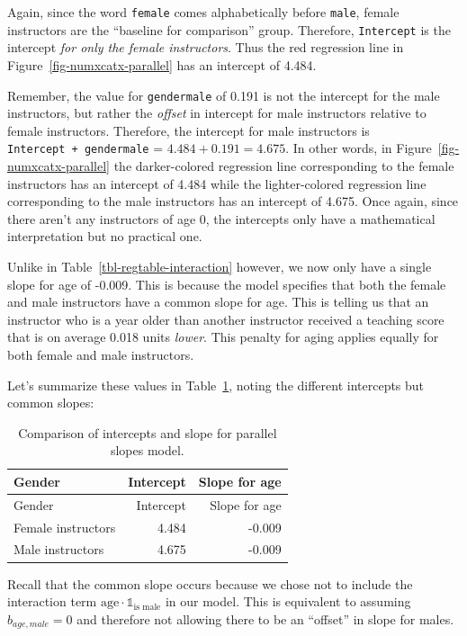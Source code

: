 \documentclass[
  letterpaper,
  DIV=11,
  numbers=noendperiod]{scrreprt}
\theoremstyle{definition}
\theoremstyle{remark}
\begin{document}
Again, since the word \texttt{female} comes alphabetically before
\texttt{male}, female instructors are the ``baseline for comparison''
group. Therefore, \texttt{Intercept} is the intercept \emph{for only the
female instructors}. Thus the red regression line in
Figure~\ref{fig-numxcatx-parallel} has an intercept of 4.484.

Remember, the value for \texttt{gendermale} of 0.191 is not the
intercept for the male instructors, but rather the \emph{offset} in
intercept for male instructors relative to female instructors.
Therefore, the intercept for male instructors is
\texttt{Intercept\ +\ gendermale} = \(4.484 + 0.191 = 4.675\). In other
words, in Figure~\ref{fig-numxcatx-parallel} the darker-colored
regression line corresponding to the female instructors has an intercept
of 4.484 while the lighter-colored regression line corresponding to the
male instructors has an intercept of 4.675. Once again, since there
aren't any instructors of age 0, the intercepts only have a mathematical
interpretation but no practical one.

Unlike in Table~\ref{tbl-regtable-interaction} however, we now only have
a single slope for age of -0.009. This is because the model specifies
that both the female and male instructors have a common slope for age.
 This is telling
us that an instructor who is a year older than another instructor
received a teaching score that is on average 0.018 units \emph{lower}.
This penalty for aging applies equally for both female and male
instructors.

Let's summarize these values in Table~\ref{tbl-parallel-slopes-summary},
noting the different intercepts but common slopes:

\hypertarget{tbl-parallel-slopes-summary}{}
\begin{longtable}[]{@{}lrr@{}}
\caption{\label{tbl-parallel-slopes-summary}Comparison of intercepts and
slope for parallel slopes model.}\tabularnewline
\toprule()
Gender & Intercept & Slope for age \\
\midrule()
\endfirsthead
\toprule()
Gender & Intercept & Slope for age \\
\midrule()
\endhead
Female instructors & 4.484 & -0.009 \\
Male instructors & 4.675 & -0.009 \\
\bottomrule()
\end{longtable}

Recall that the common slope occurs because we chose not to include the
interaction term \(\mbox{age} \cdot \mathbb{1}_{\mbox{is male}}\) in our
model. This is equivalent to assuming \(b_{age,male} = 0\) and therefore
not allowing there to be an ``offset'' in slope for males.
\end{document}
